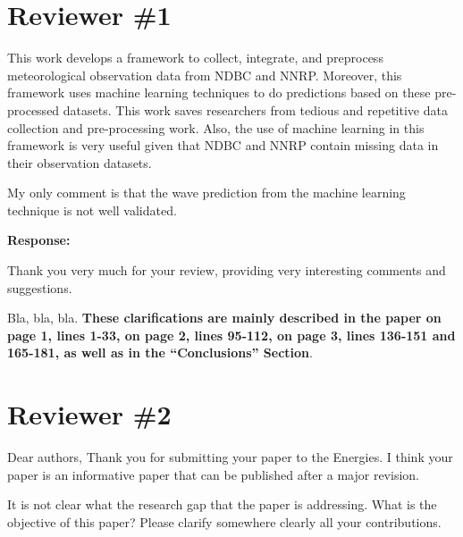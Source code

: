\documentclass[a4paper,twoside,11pt]{article}
\newcounter{comments}[section]
\newcommand{\rcomment}[1]
{
	\stepcounter{comments}
	\vspace{0.6cm}
	\begin{tcolorbox}[colback=black!5,colframe=white!45!black,title=Comment \arabic{comments}]
		#1
	\end{tcolorbox}
}
\begin{document}



\newpage
\section{Reviewer \#1}
\addtocounter{section}{-2}


\rcomment
{
This work develops a framework to collect, integrate, and preprocess meteorological observation data from NDBC and NNRP.
Moreover, this framework uses machine learning techniques to do predictions based on these pre-processed datasets. This work
saves researchers from tedious and repetitive data collection and pre-processing work. Also, the use of machine learning in this framework is very useful given that NDBC and NNRP contain missing data in their observation datasets.

\vspace{0.5cm}
My only comment is that the wave prediction from the machine learning technique is not well validated.
}


\textbf{Response:}
{
Thank you very much for your review, providing very interesting comments and suggestions. 

Bla, bla, bla. \textbf{These clarifications are mainly described in the paper on page 1, lines 1-33, on page 2, lines 95-112, on page 3, lines 136-151 and 165-181, as well as in the ``Conclusions'' Section}.
}







\newpage
\clearpage
\addtocounter{section}{+2}
\section{Reviewer \#2}
\addtocounter{section}{-2}

\rcomment{
Dear authors,
Thank you for submitting your paper to the Energies. I think your paper is an informative paper that can be published after a major revision.

\vspace{0.5cm}
It is not clear what the research gap that the paper is addressing. What is the objective of this paper? Please clarify somewhere clearly all your contributions.
}
\end{document}

